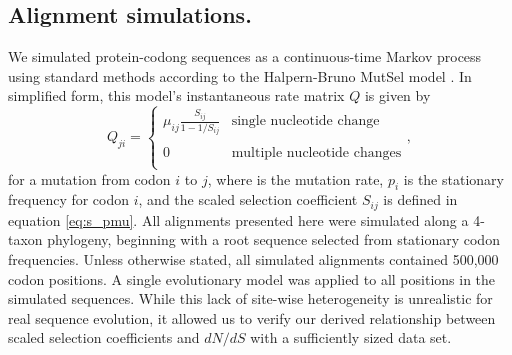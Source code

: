 \documentclass{pnastwo}
\begin{document}
\begin{article}
\subsection*{Alignment simulations.}
We simulated protein-codong sequences as a continuous-time Markov process using standard methods \cite{Yang2006} according to the Halpern-Bruno MutSel model \cite{HalpernBruno1998}. In simplified form, this model's instantaneous rate matrix $Q$ is given by
\begin{equation}\label{eq:HBmatrix}
Q_{ji} = \left\{ 
\begin{array}{rl}
\mu_{ij} \frac{S_{ij}}{1-1/S_{ij}} &\mbox{single nucleotide change} \\\\
0                                  &\mbox{multiple nucleotide changes} \\             
\end{array} \right.,
\end{equation} for a mutation from codon $i$ to $j$, where is the mutation rate, $p_i$ is the stationary frequency for codon $i$, and the scaled selection coefficient $S_{ij}$ is defined in equation \eqref{eq:s_pmu}. All alignments presented here were simulated along a 4-taxon phylogeny, beginning with a root sequence selected from stationary codon frequencies. Unless otherwise stated, all simulated alignments contained 500,000 codon positions. A single evolutionary model was applied to all positions in the simulated sequences. While this lack of site-wise heterogeneity is unrealistic for real sequence evolution, it allowed us to verify our derived relationship between scaled selection coefficients and $dN/dS$ with a sufficiently sized data set.

	

\end{article}
\end{document}
